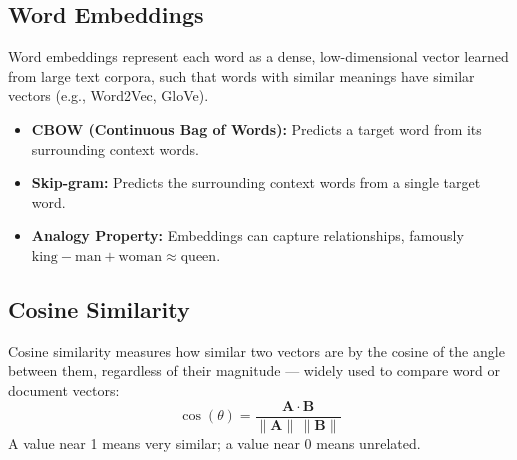 \documentclass[11pt,a4paper]{article}
\begin{document}
\subsection{Word Embeddings}
\begin{conceptbox}
Word embeddings represent each word as a dense, low-dimensional vector learned from large text corpora, such that words with similar meanings have similar vectors (e.g., Word2Vec, GloVe).
\end{conceptbox}
\begin{itemize}[leftmargin=*]
  \item \textbf{CBOW (Continuous Bag of Words):} Predicts a target word from its surrounding context words.
  \item \textbf{Skip-gram:} Predicts the surrounding context words from a single target word.
  \item \textbf{Analogy Property:} Embeddings can capture relationships, famously $\text{king} - \text{man} + \text{woman} \approx \text{queen}$.
\end{itemize}

\begin{center}
\end{center}

\subsection{Cosine Similarity}
\begin{definitionbox}
Cosine similarity measures how similar two vectors are by the cosine of the angle between them, regardless of their magnitude --- widely used to compare word or document vectors:
$$
\cos(\theta) = \frac{\mathbf{A}\cdot\mathbf{B}}{\lVert \mathbf{A}\rVert \, \lVert \mathbf{B}\rVert}
$$
A value near 1 means very similar; a value near 0 means unrelated.
\end{definitionbox}
\end{document}
